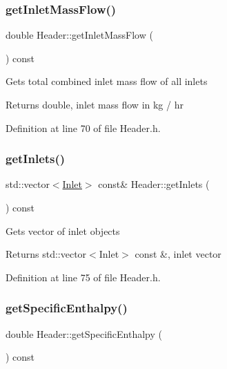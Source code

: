 \subsubsection{\texorpdfstring{get\+Inlet\+Mass\+Flow()}{getInletMassFlow()}}
{\footnotesize\ttfamily double Header\+::get\+Inlet\+Mass\+Flow (\begin{DoxyParamCaption}{ }\end{DoxyParamCaption}) const\hspace{0.3cm}{\ttfamily [inline]}}

Gets total combined inlet mass flow of all inlets \begin{DoxyReturn}{Returns}
double, inlet mass flow in kg / hr 
\end{DoxyReturn}


Definition at line 70 of file Header.\+h.

\mbox{\label{class_header_a625d7317488c88c949acd05c72a7c54a}} 
\subsubsection{\texorpdfstring{get\+Inlets()}{getInlets()}}
{\footnotesize\ttfamily std\+::vector$<$\hyperlink{class_inlet}{Inlet}$>$ const\& Header\+::get\+Inlets (\begin{DoxyParamCaption}{ }\end{DoxyParamCaption}) const\hspace{0.3cm}{\ttfamily [inline]}}

Gets vector of inlet objects \begin{DoxyReturn}{Returns}
std\+::vector$<$\+Inlet$>$ const \&, inlet vector 
\end{DoxyReturn}


Definition at line 75 of file Header.\+h.

\mbox{\label{class_header_af913dbf132f8cb3af6e6b374813acd93}} 
\subsubsection{\texorpdfstring{get\+Specific\+Enthalpy()}{getSpecificEnthalpy()}}
{\footnotesize\ttfamily double Header\+::get\+Specific\+Enthalpy (\begin{DoxyParamCaption}{ }\end{DoxyParamCaption}) const\hspace{0.3cm}{\ttfamily [inline]}}

